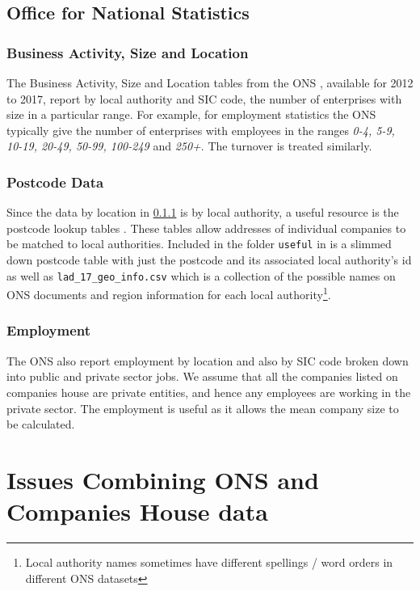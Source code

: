 \documentclass[a4paper,10pt]{article}
\begin{document}
   \subsection{Office for National Statistics}
   \subsubsection{Business Activity, Size and Location}
   \label{basl}
   The Business Activity, Size and Location tables from the ONS \cite{basl}, available for 2012 to 2017, report by local authority and SIC code, the number of enterprises with size in a particular range. For example, for employment statistics the ONS typically give the number of enterprises with employees in the ranges \emph{0-4, 5-9, 10-19, 20-49, 50-99, 100-249} and \emph{250+}. The turnover is treated similarly.
   
   \subsubsection{Postcode Data}

   Since the data by location in \ref{basl} is by local authority, a useful resource is the postcode lookup tables \cite{postcodes}. These tables allow addresses of individual companies to be matched to local authorities. Included in the folder \texttt{useful} in \cite{github} is a slimmed down postcode table with just the postcode and its associated local authority's id as well as \texttt{lad\_17\_geo\_info.csv} which is a collection of the possible names on ONS documents and region information for each local authority\footnote{Local authority names sometimes have different spellings / word orders in different ONS datasets}.

   \subsubsection{Employment}

   The ONS also report employment \cite{employment} by location and also by SIC code broken down into public and private sector jobs. We assume that all the companies listed on companies house are private entities, and hence any employees are working in the private sector. The employment is useful as it allows the mean company size to be calculated.

   \section{Issues Combining ONS and Companies House data}
\end{document}

